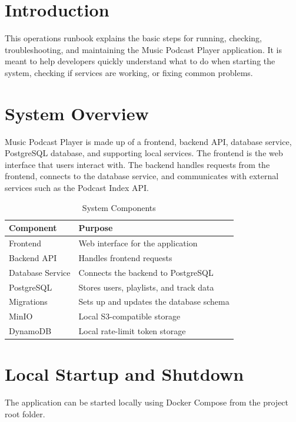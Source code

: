\documentclass{article}
\begin{document}

\section{Introduction}
This operations runbook explains the basic steps for running, checking, troubleshooting, and maintaining the Music Podcast Player application. It is meant to help developers quickly understand what to do when starting the system, checking if services are working, or fixing common problems.

\section{System Overview}
Music Podcast Player is made up of a frontend, backend API, database service, PostgreSQL database, and supporting local services. The frontend is the web interface that users interact with. The backend handles requests from the frontend, connects to the database service, and communicates with external services such as the Podcast Index API.

\begin{table}[H]
    \centering
    \begin{tabular}{l l}
        \toprule
        Component & Purpose \\
        \midrule
        Frontend & Web interface for the application \\
        Backend API & Handles frontend requests \\
        Database Service & Connects the backend to PostgreSQL \\
        PostgreSQL & Stores users, playlists, and track data \\
        Migrations & Sets up and updates the database schema \\
        MinIO & Local S3-compatible storage \\
        DynamoDB & Local rate-limit token storage \\
        \bottomrule
    \end{tabular}
    \caption{System Components}
    \label{tab:system-components}
\end{table}

\section{Local Startup and Shutdown}
The application can be started locally using Docker Compose from the project root folder.
\end{document}
